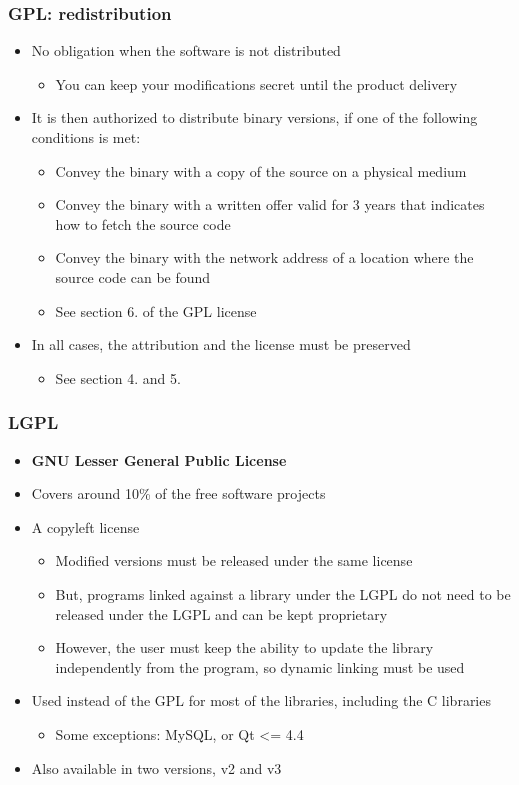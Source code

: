 \begin{frame}
  \frametitle{GPL: redistribution}
  \begin{itemize}
  \item No obligation when the software is not distributed
    \begin{itemize}
    \item You can keep your modifications secret until the product
      delivery
    \end{itemize}
  \item It is then authorized to distribute binary versions, if one of
    the following conditions is met:
    \begin{itemize}
    \item Convey the binary with a copy of the source on a physical
      medium
    \item Convey the binary with a written offer valid for 3 years
      that indicates how to fetch the source code
    \item Convey the binary with the network address of a location
      where the source code can be found
    \item See section 6. of the GPL license
    \end{itemize}
  \item In all cases, the attribution and the license must be
    preserved
    \begin{itemize}
    \item See section 4. and 5.
    \end{itemize}
  \end{itemize}
\end{frame}

\begin{frame}
  \frametitle{LGPL}
  \begin{itemize}
  \item {\bf GNU Lesser General Public License}
  \item Covers around 10\% of the free software projects
  \item A copyleft license
    \begin{itemize}
    \item Modified versions must be released under the same license
    \item But, programs linked against a library under the LGPL do not
      need to be released under the LGPL and can be kept proprietary
    \item However, the user must keep the ability to update the
      library independently from the program, so dynamic linking must
      be used
    \end{itemize}
  \item Used instead of the GPL for most of the libraries, including
    the C libraries
    \begin{itemize}
    \item Some exceptions: MySQL, or Qt \textless = 4.4
    \end{itemize}
  \item Also available in two versions, v2 and v3
  \end{itemize}
\end{frame}


